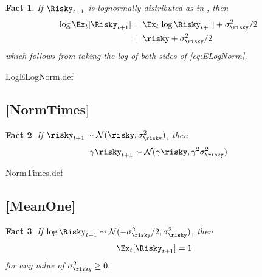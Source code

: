 \documentclass{handout}
\newtheorem{Fact}{Fact}
\begin{document}
\begin{Fact} If $\Risky_{t+1}$ is lognormally distributed as in {\ELogNorm}, then
\begin{equation}\begin{gathered}\begin{aligned}
        \log \Ex_{t}[\Risky_{t+1}] & =  \Ex_{t}[\log \Risky_{t+1}]+\sigma_{\risky}^{2}/2
\\ & =  \risky +\sigma_{\risky}^{2}/2
\end{aligned}\end{gathered}\end{equation}
which follows from taking the log of both sides of \eqref{eq:ELogNorm}.
\end{Fact}

\begin{verbatimwrite}{LogELogNorm.def}
\providecommand{\LogELogNorm}{\href{https://www.econ2.jhu.edu/people/ccarroll/public/LectureNotes/MathFacts/MathFactsList\#LogELogNorm}{\ensuremath{\mathtt{[LogELogNorm]}}}}
\end{verbatimwrite}

\hypertarget{NormTimes}{}
\subsection{[NormTimes]}\label{NormTimes}

\begin{Fact} If $\risky_{t+1} \sim \mathcal{N}(\null{\risky},\sigma_{\risky}^{2})$, then
\begin{equation}
        \gamma \risky_{t+1} \sim \mathcal{N}(\gamma \risky,\gamma^{2} \sigma_{\risky}^{2})
\end{equation}
\end{Fact}

\begin{verbatimwrite}{NormTimes.def}
\providecommand{\NormTimes}{\href{https://www.econ2.jhu.edu/people/ccarroll/public/LectureNotes/MathFacts/MathFactsList\#NormTimes}{\ensuremath{\mathtt{[NormTimes]}}}}
\end{verbatimwrite}

\hypertarget{MeanOne}{}
\subsection{[MeanOne]}

\begin{Fact} If $\log \Risky_{t+1} \sim \mathcal{N}(-\sigma_{\risky}^{2}/2,\sigma_{\risky}^{2})$, then
\begin{equation}\begin{gathered}\begin{aligned}
        \Ex_{t}[\Risky_{t+1}] & =  1
\end{aligned}\end{gathered}\end{equation}
for any value of $\sigma_{\risky}^{2} \geq 0.$
\end{Fact}
\end{document}
